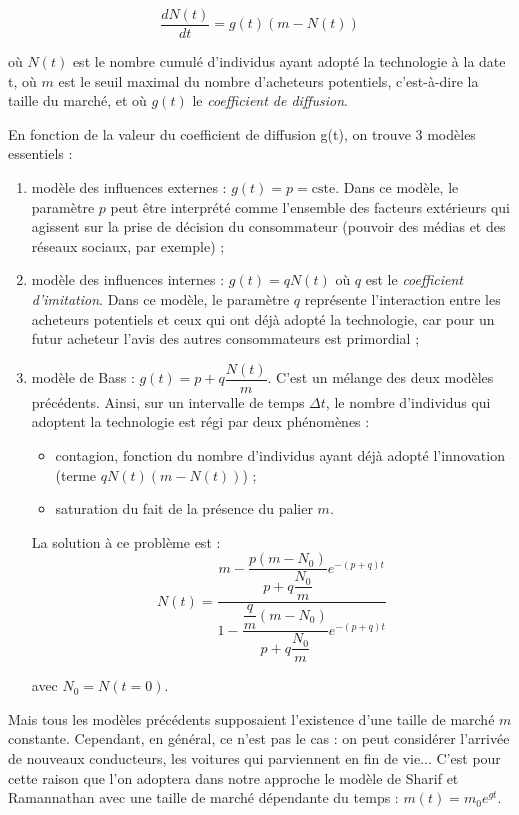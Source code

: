 			\[
				\dfrac{dN(t)}{dt}=g(t)(m-N(t))
			\]
		
		où $N(t)$ est le nombre cumulé d'individus ayant adopté la technologie à la date t, où $m$ est le seuil maximal du nombre d’acheteurs potentiels, c'est-à-dire la taille du marché, et où $g(t)$ le \textit{coefficient de diffusion}.
		
		
		En fonction de la valeur du coefficient de diffusion g(t), on trouve 3 modèles essentiels :
	
		\begin{enumerate}
			\item modèle des influences externes : $g(t) = p = \text{cste}$.
			Dans ce modèle, le paramètre $p$ peut être interprété comme l’ensemble des facteurs extérieurs qui agissent sur la prise de décision du consommateur (pouvoir des médias et des réseaux sociaux, par exemple) ;
			\item modèle des influences internes : $g(t) = q N(t)$ où $q$ est le \textit{coefficient d’imitation}. Dans ce modèle, le paramètre $q$ représente l’interaction entre les acheteurs potentiels et ceux qui ont déjà adopté la technologie, car pour un futur acheteur l’avis des autres consommateurs est primordial ;
			\item modèle de Bass : $g(t) = p + q \dfrac{N(t)}{m}$. C’est un mélange des deux modèles précédents. Ainsi, sur un intervalle de temps $\Delta t$, le nombre d’individus qui adoptent la technologie est régi par deux phénomènes : 

			\begin{itemize}
				\item contagion, fonction du nombre d’individus ayant déjà adopté l’innovation (terme $q N(t)(m - N(t))$) ;
				\item saturation du fait de la présence du palier $m$.

			\end{itemize}

			La solution à ce problème est :
				\[
					N(t) = \dfrac{m - \dfrac{p (m - N_0)}{p + q \dfrac{N_0}{m}} e^{-(p+q)t}}{1 - \dfrac{\dfrac{q}{m} (m - N_0)}{p + q \dfrac{N_0}{m}} e^{-(p+q)t}}
				\]
				
			avec $N_0 = N(t = 0)$.
		
		\end{enumerate}
		
		Mais tous les modèles précédents supposaient l’existence d’une taille de marché $m$ constante. Cependant, en général, ce n’est pas le cas : on peut considérer l’arrivée de nouveaux conducteurs, les voitures qui parviennent en fin de vie... C’est pour cette raison que l’on adoptera dans notre approche le modèle de Sharif et Ramannathan avec une taille de marché dépendante du temps : $m(t) = m_0 e^{gt}$.
		
